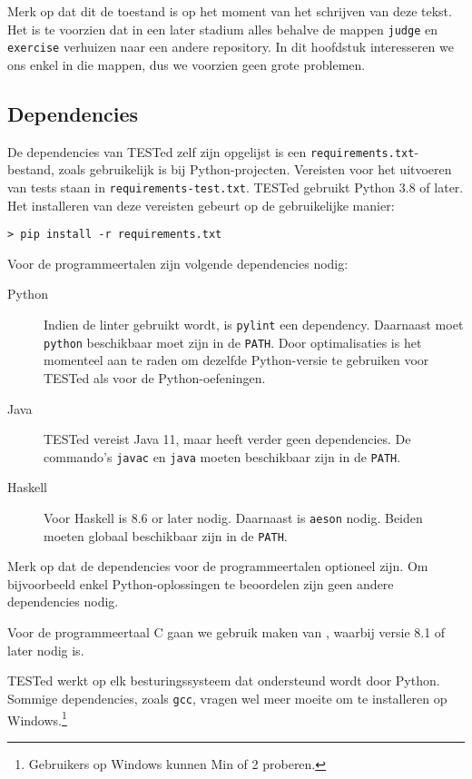 Merk op dat dit de toestand is op het moment van het schrijven van deze tekst.
Het is te voorzien dat in een later stadium alles behalve de mappen \texttt{judge} en \texttt{exercise} verhuizen naar een andere repository.
In dit hoofdstuk interesseren we ons enkel in die mappen, dus we voorzien geen grote problemen.

\subsection{Dependencies}\label{subsec:dependencies}

De dependencies van TESTed zelf zijn opgelijst is een \texttt{requirements.txt}-bestand, zoals gebruikelijk is bij Python-projecten.
Vereisten voor het uitvoeren van tests staan in \texttt{requirements-test.txt}.
TESTed gebruikt Python 3.8 of later.
Het installeren van deze vereisten gebeurt op de gebruikelijke manier:

\begin{verbatim}
> pip install -r requirements.txt
\end{verbatim}

Voor de programmeertalen zijn volgende dependencies nodig:

\begin{description}
    \item[Python] Indien de linter gebruikt wordt, is \texttt{pylint} een dependency.
    Daarnaast moet \texttt{python} beschikbaar moet zijn in de \texttt{PATH}.
    Door optimalisaties is het momenteel aan te raden om dezelfde Python-versie te gebruiken voor TESTed als voor de Python-oefeningen.
    \item[Java] TESTed vereist Java 11, maar heeft verder geen dependencies.
    De commando's \texttt{javac} en \texttt{java} moeten beschikbaar zijn in de \texttt{PATH}.
    \item[Haskell] Voor Haskell is  8.6 or later nodig.
    Daarnaast is \texttt{aeson} nodig.
    Beiden moeten globaal beschikbaar zijn in de \texttt{PATH}.
\end{description}

Merk op dat de dependencies voor de programmeertalen optioneel zijn.
Om bijvoorbeeld enkel Python-oplossingen te beoordelen zijn geen andere dependencies nodig.

Voor de programmeertaal C gaan we gebruik maken van , waarbij versie 8.1 of later nodig is.

TESTed werkt op elk besturingssysteem dat ondersteund wordt door Python.
Sommige dependencies, zoals \texttt{gcc}, vragen wel meer moeite om te installeren op Windows.\footnote{Gebruikers op Windows kunnen Min of 2 proberen.}

